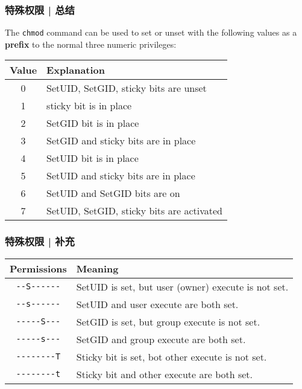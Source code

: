 \begin{frame}[fragile]
  \frametitle{特殊权限 | 总结}
  The \verb|chmod| command can be used to set or unset with the following values as a \textbf{prefix} to the normal three numeric privileges:
  \begin{table}
    \centering
    \begin{tabular}{cl}
      \hline
      \rowcolor{blue!50}Value & Explanation\\
      \hline
      0 & SetUID, SetGID, sticky bits are unset\\
      1 & sticky bit is in place\\
      2 & SetGID bit is in place\\ 
      3 & SetGID and sticky bits are in place\\
      4 & SetUID bit is in place\\
      5 & SetUID and sticky bits are in place\\
      6 & SetUID and SetGID bits are on\\
      7 & SetUID, SetGID, sticky bits are activated\\
      \hline
    \end{tabular}
  \end{table}
\end{frame}

\begin{frame}[fragile]
  \frametitle{特殊权限 | 补充}
  \begin{table}
    \centering
    \begin{tabular}{cl}
      \hline
      \rowcolor{blue!50} Permissions & Meaning\\
      \hline
      \verb|--S------| & SetUID is set, but user (owner) execute is not set.\\
      \verb|--s------| & SetUID and user execute are both set.\\
      \verb|-----S---| & SetGID is set, but group execute is not set.\\
      \verb|-----s---| & SetGID and group execute are both set.\\
      \verb|--------T| & Sticky bit is set, bot other execute is not set.\\
      \verb|--------t| & Sticky bit and other execute are both set.\\
      \hline
    \end{tabular}
  \end{table}
\end{frame}

